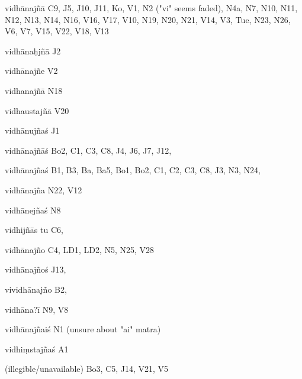 \begin{ekdosis}
\begin{marma}[hp01_055]
\begin{marma}[hp02_009]
\begin{marma}[hp02_011]
\begin{marma}[hp02_40c]
\begin{description}
        \end{description}
      \end{marma}

      \begin{marma}[hp02_43a]
      \item[vidhānajñā] C9, J5, J10, J11, Ko, V1, N2 ("vi" seems faded), N4a, N7, N10, N11, N12, N13, N14, N16, V16, V17, V10, N19, N20, N21, V14, V3, Tue, N23, N26, V6, V7, V15, V22, V18, V13
      \item[vidhānaḥjñā] J2
      \item[vidhānajñe] V2
      \item[vidhanajñā] N18
      \item[vidhaustajñā] V20
      \item[vidhānujñaś] J1
      \item[vidhānajñāś] Bo2, C1, C3, C8, J4, J6, J7, J12, 
      \item[vidhānajñaś] B1, B3, Ba, Ba5, Bo1, Bo2, C1, C2, C3, C8, J3, N3, N24,
      \item[vidhānajña] N22, V12
      \item[vidhānejñaś] N8
      \item[vidhijñās tu] C6,
      \item[vidhānajño] C4, LD1, LD2, N5, N25, V28
      \item[vidhānajñoś] J13, 
      \item[vividhānajño] B2, 
      \item[vidhāna?ī] N9, V8
      \item[vidhānajñaiś] N1 (unsure about "ai" matra)
      \item[vidhiṃstajñaś] A1
      \item[(illegible/unavailable)] Bo3, C5, J14, V21, V5
        \begin{description}

        \end{description}
      \end{marma}


\end{marma}
\end{marma}
\end{marma}
\end{ekdosis}
